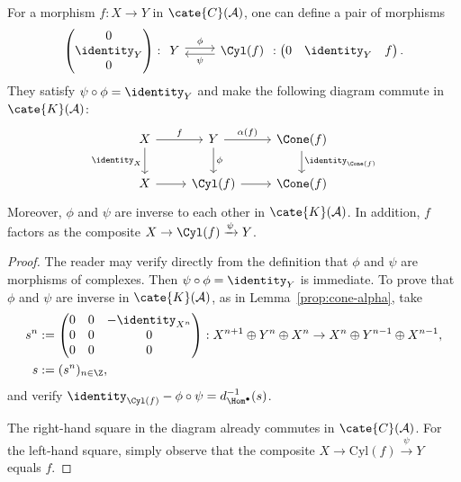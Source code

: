 \begin{lemma}\label{prop:cone-beta}
	For a morphism $f:X\to Y$ in $\cate{C}(\mathcal{A})$, one can define a
	pair of morphisms
	\[ \begin{pmatrix} 0 \\ \identity_Y \\ 0 \end{pmatrix} : \begin{tikzcd} Y \arrow[r, shift left, "\phi"] & \Cyl(f) \arrow[l, shift left, "\psi"] \end{tikzcd} : \begin{pmatrix} 0 & \identity_Y & f \end{pmatrix}. \]
	They satisfy $\psi\circ\phi=\identity_Y$ and make the following diagram
	commute in $\cate{K}(\mathcal{A})$:
	\[\begin{tikzcd}
		X \arrow[d, "{\identity_X}"'] \arrow[r, "f"] & Y \arrow[d, "\phi"] \arrow[r, "{\alpha(f)}"] & \Cone(f) \arrow[d, "{\identity_{\Cone(f)}}"] \\
		X \arrow[r] & \Cyl(f) \arrow[r] & \Cone(f)
	\end{tikzcd}\]
	Moreover, $\phi$ and $\psi$ are inverse to each other in
	$\cate{K}(\mathcal{A})$. In addition, $f$ factors as the composite
	$X\to\Cyl(f)\xrightarrow{\psi}Y$.
\end{lemma}
\begin{proof}
	The reader may verify directly from the definition that $\phi$ and $\psi$
	are morphisms of complexes. Then $\psi\circ\phi=\identity_Y$ is immediate.
	To prove that $\phi$ and $\psi$ are inverse in $\cate{K}(\mathcal{A})$,
	as in Lemma~\ref{prop:cone-alpha}, take
	\begin{align*}
		s^n & := \begin{pmatrix} 0 & 0 & -\identity_{X^n} \\ 0 & 0 & 0 \\ 0 & 0 & 0 \end{pmatrix}: X^{n+1} \oplus Y^n \oplus X^n \to X^n \oplus Y^{n-1} \oplus X^{n-1}, \\
		s & := (s^n)_{n \in \Z},
	\end{align*}
	and verify
	$\identity_{\Cyl(f)}-\phi\circ\psi=d^{-1}_{\Hom^\bullet}(s)$.

	The right-hand square in the diagram already commutes in
	$\cate{C}(\mathcal{A})$. For the left-hand square, simply observe that
	the composite $X\to\mathrm{Cyl}(f)\xrightarrow{\psi}Y$ equals $f$.
\end{proof}

